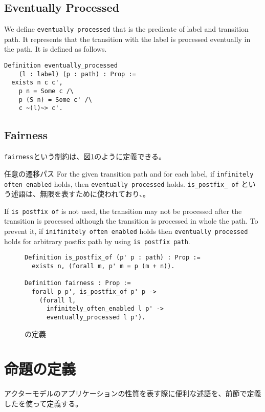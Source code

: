 \subsection{Eventually Processed}
We define \texttt{eventually processed} that is the predicate of label and transition path.
It represents that the transition with the label is processed eventually in the path.
It is defined as follows.

\begin{lstlisting}
Definition eventually_processed
    (l : label) (p : path) : Prop :=
  exists n c c',
    p n = Some c /\
    p (S n) = Some c' /\
    c ~(l)~> c'.
\end{lstlisting}


\subsection{Fairness}
\texttt{fairness}という制約は、図\ref{code:formalization:fairness}のように定義できる。

任意の遷移パス
For the given transition path and for each label, if \texttt{infinitely often enabled} holds, then \texttt{eventually processed} holds.
\texttt{is\_postfix\_ of} という述語は、無限を表すために使われており、。

If \texttt{is postfix of} is not used, the transition may not be processed after the transition is processed although the transition is processed in whole the path.
To prevent it, if \texttt{inifinitely often enabled} holds then \texttt{eventually processed} holds for arbitrary postfix path by using \texttt{is postfix path}.

\begin{figure}
\begin{lstlisting}
Definition is_postfix_of (p' p : path) : Prop :=
  exists n, (forall m, p' m = p (m + n)).

Definition fairness : Prop :=
  forall p p', is_postfix_of p' p ->
    (forall l,
      infinitely_often_enabled l p' ->
      eventually_processed l p').
\end{lstlisting}
\label{code:formalization:fairness}
\caption{\fairness の定義}
\end{figure}

\section{命題の定義}

アクターモデルのアプリケーションの性質を表す際に便利な述語を、前節で定義したを使って定義する。

